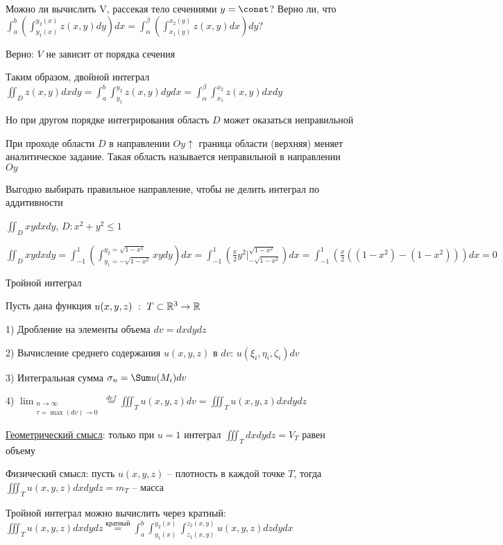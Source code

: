 \documentclass[12pt]{article}
\begin{document}
    Можно ли вычислить V, рассекая тело сечениями $y = \const$? Верно ли, что $\int_a^b \left(\int_{y_1(x)}^{y_2(x)} z(x, y) dy\right) dx = \int_\alpha^\beta \left(\int_{x_1(y)}^{x_2(y)} z(x, y) dx\right) dy$?

    Верно: $V$ не зависит от порядка сечения

    Таким образом, двойной интеграл $\iint_D z(x, y) dxdy = \int_a^b \int_{y_1}^{y_2} z(x, y) dydx = \int_\alpha^\beta \int_{x_1}^{x_2} z(x, y) dxdy$

    Но при другом порядке интегрирования область $D$ может оказаться неправильной

    \Def При проходе области $D$ в направлении $Oy \uparrow$ граница области (верхняя) меняет аналитическое задание. Такая область называется неправильной в направлении $Oy$

    Выгодно выбирать правильное направление, чтобы не делить интеграл по аддитивности

    \Ex $\iint_D xy dx dy$, $D : x^2 + y^2 \leq 1$

    $\iint_D xy dx dy = \int_{-1}^1 \left(\int_{y_1 = -\sqrt{1-x^2}}^{y_2 = \sqrt{1-x^2}} xy dy\right) dx = \int_{-1}^1 \left(\frac{x}{2} y^2 \Big|_{-\sqrt{1-x^2}}^{\sqrt{1-x^2}}\right) dx =
    \int_{-1}^1 \left(\frac{x}{2} ((1 - x^2) - (1 - x^2))\right) dx = 0$

    \hypertarget{tripleintegral}{}

    \Def Тройной интеграл

    Пусть дана функция $u(x, y, z) \ : \ T \subset \mathbb{R}^3 \rightarrow \mathbb{R}$

    1) Дробление на элементы объема $dv = dxdydz$

    2) Вычисление среднего содержания $u(x, y, z)$ в $dv$: $u(\xi_i, \eta_i, \zeta_i) dv$

    3) Интегральная сумма $\sigma_n = \Sum u(M_i) dv$

    4) $\lim_{\substack{n \to \infty \\ \tau = \max (dv) \to 0}} \stackrel{def}{=} \iiint_T u(x, y, z) dv = \iiint_T u(x, y, z) dxdydz$


    \underline{Геометрический смысл}: только при $u = 1$ интеграл $\iiint_T dxdydz = V_T$ равен объему

    Физический смысл: пусть $u(x, y, z)$ -- плотность в каждой точке $T$, тогда $\iiint_T u(x, y, z) dxdydz = m_T$ -- масса

    \hypertarget{tripleintegralcalculation}{}

    Тройной интеграл можно вычислить через кратный: $\iiint_T u(x, y, z) dxdydz \stackrel{\text{кратный}}{=} \int^b_a \int_{y_1(x)}^{y_2(x)} \int_{z_1(x, y)}^{z_2(x, y)} u(x, y, z) dz dy dx$
\end{document}
